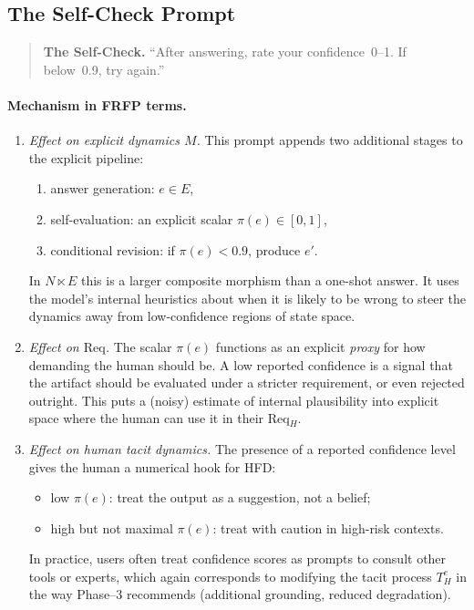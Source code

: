 \subsection{The Self-Check Prompt}

\begin{quote}
\textbf{The Self-Check.} ``After answering, rate your confidence~0--1.
If below~0.9, try again.''
\end{quote}

\paragraph{Mechanism in FRFP terms.}

\begin{enumerate}
  \item \emph{Effect on explicit dynamics $M$.} This prompt appends two
    additional stages to the explicit pipeline:
    \begin{enumerate}
      \item answer generation: $e \in E$,
      \item self-evaluation: an explicit scalar $\pi(e) \in [0,1]$,
      \item conditional revision: if $\pi(e) < 0.9$, produce $e'$.
    \end{enumerate}
    In $N \ltimes E$ this is a larger composite morphism than a one-shot
    answer. It uses the model's internal heuristics about when it is
    likely to be wrong to steer the dynamics away from low-confidence
    regions of state space.

  \item \emph{Effect on $\mathrm{Req}$.} The scalar $\pi(e)$ functions
    as an explicit \emph{proxy} for how demanding the human should be.
    A low reported confidence is a signal that the artifact should be
    evaluated under a stricter requirement, or even rejected outright.
    This puts a (noisy) estimate of internal plausibility into explicit
    space where the human can use it in their Req\(_H\).

  \item \emph{Effect on human tacit dynamics.} The presence of a reported
    confidence level gives the human a numerical hook for HFD:
    \begin{itemize}
      \item low $\pi(e)$: treat the output as a suggestion, not a belief;
      \item high but not maximal $\pi(e)$: treat with caution in high-risk
            contexts.
    \end{itemize}
    In practice, users often treat confidence scores as prompts to consult
    other tools or experts, which again corresponds to modifying the tacit
    process $T^e_H$ in the way Phase--3 recommends (additional grounding,
    reduced degradation).
\end{enumerate}

